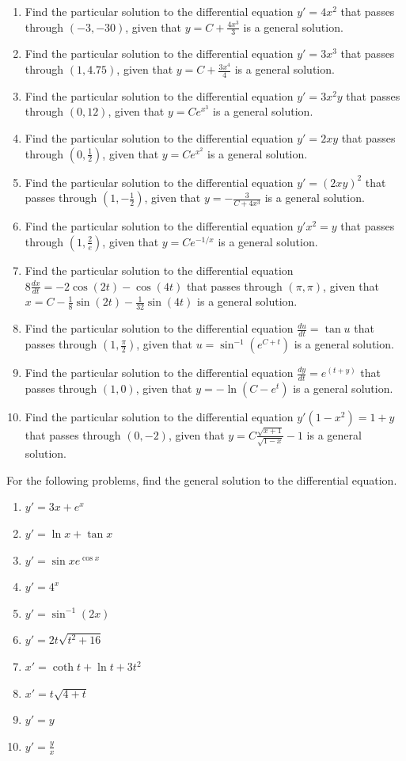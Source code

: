 \documentclass{exercises}
\begin{document}
\begin{enumerate}[resume]
\item Find the particular solution to the differential equation $y'=4x^{2}$ that passes through $(-3,-30)$, given that $y=C+\frac{4x^{3}}{3}$ is a general solution.
\item Find the particular solution to the differential equation $y'=3x^{3}$ that passes through $(1,4.75)$, given that $y=C+\frac{3x^{4}}{4}$ is a general solution.
\item Find the particular solution to the differential equation $y'=3x^{2}y$ that passes through $(0,12)$, given that $y=Ce^{x^{3}}$ is a general solution.
\item Find the particular solution to the differential equation $y'=2xy$ that passes through $(0,\frac{1}{2})$, given that $y=Ce^{x^{2}}$ is a general solution.
\item Find the particular solution to the differential equation $y'={(2xy)}^{2}$ that passes through $(1,-\frac{1}{2})$, given that $y=-\frac{3}{C+4x^{3}}$ is a general solution.
\item Find the particular solution to the differential equation $y'x^{2}=y$ that passes through $(1,\frac{2}{e})$, given that $y=Ce^{-1/x}$ is a general solution.
\item Find the particular solution to the differential equation $8\frac{dx}{dt}=-2\cos(2t)-\cos(4t)$ that passes through $(\pi,\pi)$, given that $x=C-\frac{1}{8}\sin(2t)-\frac{1}{32}\sin(4t)$ is a general solution.
\item Find the particular solution to the differential equation $\frac{du}{dt}=\tan u$ that passes through $(1,\frac{\pi}{2})$, given that $u=\sin^{-1}(e^{C+t})$ is a general solution.
\item Find the particular solution to the differential equation $\frac{dy}{dt}=e^{(t+y)}$ that passes through $(1,0)$, given that $y=-\ln(C-e^{t})$ is a general solution.
\item Find the particular solution to the differential equation $y'(1-x^{2})=1+y$ that passes through $(0,-2)$, given that $y=C\frac{\sqrt{x+1}}{\sqrt{1-x}}-1$ is a general solution.
\end{enumerate}

\par\medskip
For the following problems, find the general solution to the differential equation.

\begin{enumerate}[resume]
\item $y'=3x+e^{x}$
\item $y'=\ln x+\tan x$
\item $y'=\sin xe^{\cos x}$
\item $y'=4^{x}$
\item $y'=\sin^{-1}(2x)$
\item $y'=2t\sqrt{t^{2}+16}$
\item $x'=\coth t+\ln t+3t^{2}$
\item $x'=t\sqrt{4+t}$
\item $y'=y$
\item $y'=\frac{y}{x}$
\end{enumerate}
\end{document}

